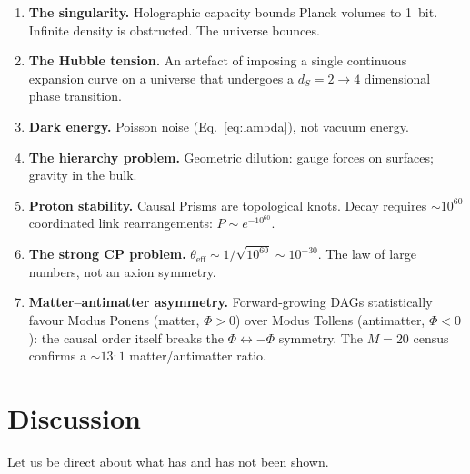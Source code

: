 \documentclass[aps,prd,twocolumn,superscriptaddress,nofootinbib,amsmath,amssymb,longbibliography]{revtex4-2}
\newcommand{\ds}{d_S}
\begin{document}
\begin{enumerate}[itemsep=2pt,parsep=0pt,topsep=4pt,partopsep=0pt,leftmargin=1.8em]

\item \textbf{The singularity.}
Holographic capacity bounds Planck volumes to 1~bit.
Infinite density is obstructed.  The universe bounces.

\item \textbf{The Hubble tension.}
An artefact of imposing a single continuous expansion curve on a universe
that undergoes a $\ds = 2 \to 4$ dimensional phase transition.

\item \textbf{Dark energy.}
Poisson noise (Eq.~\ref{eq:lambda}), not vacuum energy.

\item \textbf{The hierarchy problem.}
Geometric dilution: gauge forces on surfaces; gravity in the bulk.

\item \textbf{Proton stability.}
Causal Prisms are topological knots.
Decay requires ${\sim}10^{60}$ coordinated link rearrangements:
$P \sim e^{-10^{60}}$.

\item \textbf{The strong CP problem.}
$\theta_{\text{eff}} \sim 1/\sqrt{10^{60}} \sim 10^{-30}$.
The law of large numbers, not an axion symmetry.

\item \textbf{Matter--antimatter asymmetry.}
Forward-growing DAGs statistically favour Modus Ponens
(matter, $\Phi > 0$) over Modus Tollens (antimatter, $\Phi < 0$):
the causal order itself breaks the $\Phi \leftrightarrow -\Phi$
symmetry.  The $M{=}20$ census confirms a ${\sim}13{:}1$
matter/antimatter ratio.

\end{enumerate}

\section{Discussion}\label{sec:discussion}

Let us be direct about what has and has not been shown.
\end{document}
